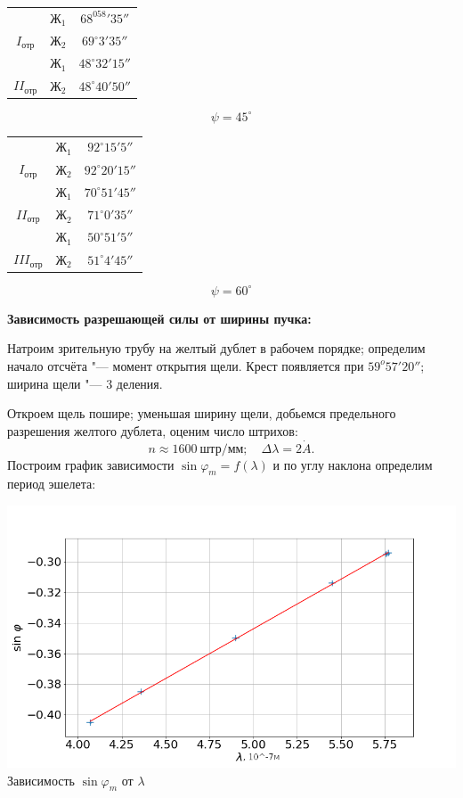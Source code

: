 \documentclass[a4paper,12pt]{article}
\begin{document}
\begin{center}
\begin{tabular}{|c|c|c|} \hline
& $Ж_1$ & $68^058'35''$\\
\cline{2-3}
$I_{отр}$
& $Ж_2$ & $69^\circ3'35''$ \\\hline
& $Ж_1$ & $48^\circ32'15''$ \\
\cline{2-3}
$II_{отр}$
& $Ж_2$ & $48^\circ40'50''$ \\\hline
\end{tabular}
$$\psi = 45^\circ$$
\end{center}

\begin{center}
\begin{tabular}{|c|c|c|} \hline
& $Ж_1$ & $92^\circ15'5''$\\
\cline{2-3}
$I_{отр}$
& $Ж_2$ & $92^\circ20'15''$ \\\hline
& $Ж_1$ & $70^\circ51'45''$ \\
\cline{2-3}
$II_{отр}$
& $Ж_2$ & $71^\circ0'35''$ \\\hline
& $Ж_1$ & $50^\circ51'5''$\\
\cline{2-3}
$III_{отр}$
& $Ж_2$ & $51^\circ4'45''$ \\\hline
\end{tabular}
$$\psi = 60^\circ$$
\end{center}

\textbf{Зависимость разрешающей силы от ширины пучка:}

Натроим зрительную трубу на желтый дублет в рабочем порядке; определим начало отсчёта "--- момент открытия щели. Крест появляется при $59^o57'20''$; ширина щели "--- 3 деления.

Откроем щель пошире; уменьшая ширину щели, добьемся предельного разрешения желтого дублета, оценим число штрихов:
\[
     n \approx 1600\ \text{штр}/\text{мм}; \quad \Delta \lambda = 2 \dot A.
\]
Построим график зависимости $\sin \varphi_m = f(\lambda)$ и по углу наклона определим период эшелета:

\includegraphics[width = 1.0\linewidth]{g1.png}
{Зависимость $\sin \varphi_m$ от $\lambda$}
\end{document}
